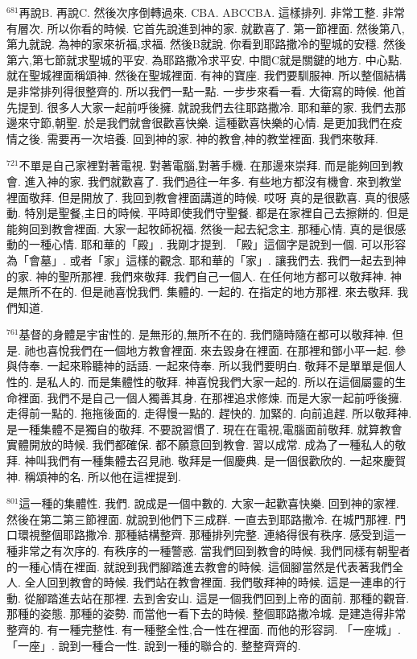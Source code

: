 \documentclass{book}
\begin{document}
$^{681}$再說B.
再說C.
然後次序倒轉過來.
CBA.
ABCCBA.
這樣排列.
非常工整.
非常有層次.
所以你看的時候.
它首先說進到神的家.
就歡喜了.
第一節裡面.
然後第八,第九就說.
為神的家來祈福,求福.
然後B就說.
你看到耶路撒冷的聖城的安穩.
然後第六,第七節就求聖城的平安.
為耶路撒冷求平安.
中間C就是關鍵的地方.
中心點.
就在聖城裡面稱頌神.
然後在聖城裡面.
有神的寶座.
我們要馴服神.
所以整個結構是非常排列得很整齊的.
所以我們一點一點.
一步步來看一看.
大衛寫的時候.
他首先提到.
很多人大家一起前呼後擁.
就說我們去往耶路撒冷.
耶和華的家.
我們去那邊來守節,朝聖.
於是我們就會很歡喜快樂.
這種歡喜快樂的心情.
是更加我們在疫情之後.
需要再一次培養.
回到神的家.
神的教會,神的教堂裡面.
我們來敬拜.

$^{721}$不單是自己家裡對著電視.
對著電腦,對著手機.
在那邊來崇拜.
而是能夠回到教會.
進入神的家.
我們就歡喜了.
我們過往一年多.
有些地方都沒有機會.
來到教堂裡面敬拜.
但是開放了.
我回到教會裡面講道的時候.
哎呀 真的是很歡喜.
真的很感動.
特別是聖餐,主日的時候.
平時即使我們守聖餐.
都是在家裡自己去擦餅的.
但是能夠回到教會裡面.
大家一起牧師祝福.
然後一起去紀念主.
那種心情.
真的是很感動的一種心情.
耶和華的「殿」.
我剛才提到.
「殿」這個字是說到一個.
可以形容為「會墓」.
或者「家」這樣的觀念.
耶和華的「家」.
讓我們去.
我們一起去到神的家.
神的聖所那裡.
我們來敬拜.
我們自己一個人.
在任何地方都可以敬拜神.
神是無所不在的.
但是祂喜悅我們.
集體的.
一起的.
在指定的地方那裡.
來去敬拜.
我們知道.

$^{761}$基督的身體是宇宙性的.
是無形的,無所不在的.
我們隨時隨在都可以敬拜神.
但是.
祂也喜悅我們在一個地方教會裡面.
來去毀身在裡面.
在那裡和鄧小平一起.
參與侍奉.
一起來聆聽神的話語.
一起來侍奉.
所以我們要明白.
敬拜不是單單是個人性的.
是私人的.
而是集體性的敬拜.
神喜悅我們大家一起的.
所以在這個屬靈的生命裡面.
我們不是自己一個人獨善其身.
在那裡追求修煉.
而是大家一起前呼後擁.
走得前一點的.
拖拖後面的.
走得慢一點的.
趕快的.
加緊的.
向前追趕.
所以敬拜神.
是一種集體不是獨自的敬拜.
不要說習慣了.
現在在電視,電腦面前敬拜.
就算教會實體開放的時候.
我們都確保.
都不願意回到教會.
習以成常.
成為了一種私人的敬拜.
神叫我們有一種集體去召見祂.
敬拜是一個慶典.
是一個很歡欣的.
一起來慶賀神.
稱頌神的名.
所以他在這裡提到.

$^{801}$這一種的集體性.
我們.
說成是一個中數的.
大家一起歡喜快樂.
回到神的家裡.
然後在第二第三節裡面.
就說到他們下三成群.
一直去到耶路撒冷.
在城門那裡.
門口環視整個耶路撒冷.
那種結構整齊.
那種排列完整.
連絡得很有秩序.
感受到這一種非常之有次序的.
有秩序的一種警惑.
當我們回到教會的時候.
我們同樣有朝聖者的一種心情在裡面.
就說到我們腳踏進去教會的時候.
這個腳當然是代表著我們全人.
全人回到教會的時候.
我們站在教會裡面.
我們敬拜神的時候.
這是一連串的行動.
從腳踏進去站在那裡.
去到舍安山.
這是一個我們回到上帝的面前.
那種的觀音.
那種的姿態.
那種的姿勢.
而當他一看下去的時候.
整個耶路撒冷城.
是建造得非常整齊的.
有一種完整性.
有一種整全性,合一性在裡面.
而他的形容詞.
「一座城」.
「一座」.
說到一種合一性.
說到一種的聯合的.
整整齊齊的.
\end{document}

